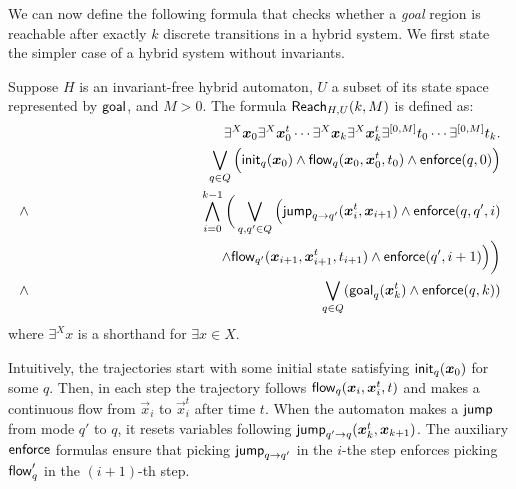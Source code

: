We can now define the following formula that checks whether a {\em goal} region is reachable after 
exactly $k$ discrete transitions in a hybrid system. We first state the simpler case of a hybrid
system without invariants.
\begin{definition}
Suppose $H$ is an invariant-free hybrid automaton, $U$ a subset of its state space represented by $\mathsf{goal}$,
and $M>0$. The formula $\mathsf{Reach}_{H,U}(k,M)$ is defined as:
\begin{eqnarray*}
& &\exists^X \vec x_{0} \exists^X\vec x_{0}^t\cdots \exists^X \vec x_{k}\exists^X\vec x_{k}^t\exists^{[0,M]}t_0\cdots \exists^{[0,M]}t_k.\\
& &\bigvee_{q\in Q} \Big(\init_{q}(\vec x_{0})\wedge \flow_{q}(\vec x_{0}, \vec x_{0}^t, t_0)\wedge \enforce(q,0)\Big)\\%
\wedge & & \bigwedge_{i=0}^{k-1}\bigg( \bigvee_{q, q'\in Q} \Big(\jump_{q\rightarrow q'}(\vec x_{i}^t, \vec x_{i+1})\wedge \enforce(q,q',i)\\
& & \hspace{4.5cm}\wedge\flow_{q'}(\vec x_{i+1}, \vec x_{i+1}^t, t_{i+1})\wedge \enforce(q',i+1)\Big)\bigg)\\
\wedge & &\bigvee_{q\in Q} (\goal_q(\vec x_{k}^t)\wedge \enforce(q,k))
\end{eqnarray*}
where $\exists^X x$ is a shorthand for $\exists x\in X$.
\end{definition}
Intuitively, the trajectories start with some initial state satisfying $\init_q(\vec x_{0})$ for some $q$. 
Then, in each step the trajectory follows $\flow_q(\vec x_{i}, \vec x_{i}^t, t)$ and makes a continuous flow from $\vec x_i$ to $\vec x_i^t$ after time $t$. When the automaton makes a $\mathsf{jump}$ from mode $q'$ to $q$, it resets variables following $\jump_{q'\rightarrow q}(\vec x_{k}^t, \vec x_{k+1})$. The auxiliary $\mathsf{enforce}$ formulas ensure that picking $\mathsf{jump}_{q\rightarrow q'}$ in the $i$-the step enforces picking $\mathsf{flow}_q'$ in the $(i+1)$-th step.


